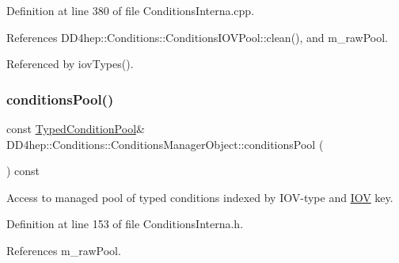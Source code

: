 Definition at line 380 of file Conditions\+Interna.\+cpp.



References D\+D4hep\+::\+Conditions\+::\+Conditions\+I\+O\+V\+Pool\+::clean(), and m\+\_\+raw\+Pool.



Referenced by iov\+Types().

\hypertarget{class_d_d4hep_1_1_conditions_1_1_conditions_manager_object_ac7ad54c38522f1eab91dbe077b4dd6ce}{}\label{class_d_d4hep_1_1_conditions_1_1_conditions_manager_object_ac7ad54c38522f1eab91dbe077b4dd6ce} 
\subsubsection{\texorpdfstring{conditions\+Pool()}{conditionsPool()}}
{\footnotesize\ttfamily const \hyperlink{class_d_d4hep_1_1_conditions_1_1_conditions_manager_object_a1617c134372fbb79d06990707f19bb0c}{Typed\+Condition\+Pool}\& D\+D4hep\+::\+Conditions\+::\+Conditions\+Manager\+Object\+::conditions\+Pool (\begin{DoxyParamCaption}{ }\end{DoxyParamCaption}) const\hspace{0.3cm}{\ttfamily [inline]}}



Access to managed pool of typed conditions indexed by I\+O\+V-\/type and \hyperlink{class_d_d4hep_1_1_i_o_v}{I\+OV} key. 



Definition at line 153 of file Conditions\+Interna.\+h.



References m\+\_\+raw\+Pool.

\hypertarget{class_d_d4hep_1_1_conditions_1_1_conditions_manager_object_a9ff0d68cbe3771a7a9354bdf518ddd11}{}\label{class_d_d4hep_1_1_conditions_1_1_conditions_manager_object_a9ff0d68cbe3771a7a9354bdf518ddd11} 
